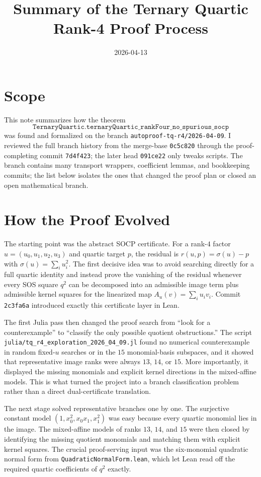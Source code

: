 \documentclass[10pt]{article}
\title{Summary of the Ternary Quartic Rank-4 Proof Process}
\date{2026-04-13}
\begin{document}
\maketitle

\section*{Scope}
This note summarizes how the theorem
\[
  \texttt{TernaryQuartic.ternaryQuartic\_rankFour\_no\_spurious\_socp}
\]
was found and formalized on the branch
\texttt{autoproof-tq-r4/2026-04-09}. I reviewed the full branch history from
the merge-base \texttt{0c5c820} through the proof-completing commit
\texttt{7d4f423}; the later head \texttt{091ce22} only tweaks scripts. The
branch contains many transport wrappers, coefficient lemmas, and bookkeeping
commits; the list below isolates the ones that changed the proof plan or closed
an open mathematical branch.

\section*{How the Proof Evolved}
The starting point was the abstract SOCP certificate. For a rank-$4$ factor
$u=(u_0,u_1,u_2,u_3)$ and quartic target $p$, the residual is
$r(u,p)=\sigma(u)-p$ with $\sigma(u)=\sum_i u_i^2$. The first decisive idea was
to avoid searching directly for a full quartic identity and instead prove the
vanishing of the residual whenever every SOS square $q^2$ can be decomposed
into an admissible image term plus admissible kernel squares for the linearized
map $A_u(v)=\sum_i u_i v_i$. Commit \texttt{2c3fa6a} introduced exactly this
certificate layer in Lean.

The first Julia pass then changed the proof search from ``look for a counterexample''
to ``classify the only possible quotient obstructions.'' The script
\texttt{julia/tq\_r4\_exploration\_2026\_04\_09.jl} found no numerical
counterexample in random fixed-$u$ searches or in the $15$ monomial-basis
subspaces, and it showed that representative image ranks were always
$13$, $14$, or $15$. More importantly, it displayed the missing monomials and
explicit kernel directions in the mixed-affine models. This is what turned the
project into a branch classification problem rather than a direct dual-certificate
translation.

The next stage solved representative branches one by one. The surjective
constant model $(1,x_0^2,x_0x_1,x_1^2)$ was easy because every quartic monomial
lies in the image. The mixed-affine models of ranks $13$, $14$, and $15$ were
then closed by identifying the missing quotient monomials and matching them
with explicit kernel squares. The crucial proof-serving input was the
six-monomial quadratic normal form from
\texttt{QuadraticNormalForm.lean}, which let Lean read off the required
quartic coefficients of $q^2$ exactly.
\end{document}
